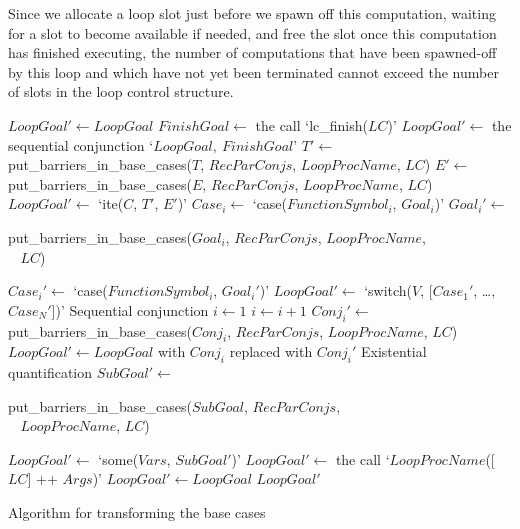 \noindent
Since we allocate a loop slot 
just before we spawn off this computation,
waiting for a slot to become available if needed,
and free the slot once this computation has finished executing,
the number of computations that have been spawned-off by this loop
and which have not yet been terminated
cannot exceed the number of slots in the loop control structure.

\begin{algorithm}[tbp]
\begin{algorithmic}
    \State $LoopGoal' \gets LoopGoal$
    \State $FinishGoal \gets$ the call `lc\_finish($LC$)'
    \State $LoopGoal' \gets$ the sequential conjunction
      `$LoopGoal,~FinishGoal$'
  \Else
        \State $T' \gets$ put\_barriers\_in\_base\_cases($T$,
          $RecParConjs$, $LoopProcName$, $LC$)
        \State $E' \gets$ put\_barriers\_in\_base\_cases($E$,
          $RecParConjs$, $LoopProcName$, $LC$)
        \State $LoopGoal' \gets$ `ite($C$, $T'$, $E'$)'
      \EndCase
          \State $Case_i \gets$ `case($FunctionSymbol_i$, $Goal_i$)'
          \State $Goal_i' \gets$ \parbox{0.7\textwidth}{put\_barriers\_in\_base\_cases($Goal_i$,
            $RecParConjs$, $LoopProcName$,\\$~~~~LC$)}
          \State $Case_i' \gets$ `case($FunctionSymbol_i$, $Goal_i'$)'
        \EndFor
        \State $LoopGoal' \gets$ `switch($V$, [$Case_1'$, \ldots, $Case_N'$])'
      \EndCase
        \Comment Sequential conjunction
        \State $i \gets 1$
          \State $i \gets i + 1$
        \EndWhile
        \State $Conj_i' \gets$ put\_barriers\_in\_base\_cases($Conj_i$,
          $RecParConjs$, $LoopProcName$, $LC$)
        \State $LoopGoal' \gets LoopGoal$ with
          $Conj_i$ replaced with $Conj_i'$
      \EndCase
        \Comment Existential quantification
        \State $SubGoal' \gets$ \parbox{0.7\textwidth}{put\_barriers\_in\_base\_cases($SubGoal$,
          $RecParConjs$,\\$~~~~LoopProcName$, $LC$)}
        \State $LoopGoal' \gets$ `some($Vars$, $SubGoal'$)'
      \EndCase
          \State $LoopGoal' \gets$ the call `$LoopProcName$([$LC$] ++ $Args$)'
        \Else
          \State $LoopGoal' \gets LoopGoal$
        \EndIf
      \EndCase
    \EndSwitch
  \EndIf
  \State \Return $LoopGoal'$
\EndProcedure
\end{algorithmic}
\caption{Algorithm for transforming the base cases}
\label{alg:basecases_alg}
\end{algorithm}

